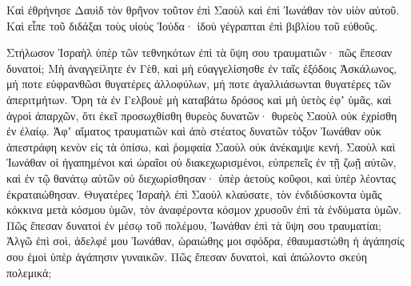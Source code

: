 {\par }{\PP {}Καὶ ἐθρήνησε Δαυὶδ τὸν θρῆνον τοῦτον ἐπὶ Σαοὺλ καὶ ἐπὶ Ἰωνάθαν τὸν υἱὸν αὐτοῦ.
Καὶ εἶπε τοῦ διδάξαι τοὺς υἱοὺς Ἰούδα· ἰδοὺ γέγραπται ἐπὶ βιβλίου τοῦ εὐθοῦς.
\par }{\PP {}Στήλωσον Ἰσραὴλ ὑπὲρ τῶν τεθνηκότων ἐπὶ τὰ ὕψη σου τραυματιῶν· πῶς ἔπεσαν δυνατοί;
Μὴ ἀναγγείλητε ἐν Γὲθ, καὶ μὴ εὐαγγελίσησθε ἐν ταῖς ἐξόδοις Ἀσκάλωνος, μή ποτε εὐφρανθῶσι θυγατέρες ἀλλοφύλων, μή ποτε ἀγαλλιάσωνται θυγατέρες τῶν ἀπεριτμήτων.
Ὄρη τὰ ἐν Γελβουὲ μὴ καταβάτω δρόσος καὶ μὴ ὑετὸς ἐφʼ ὑμᾶς, καὶ ἀγροὶ ἀπαρχῶν, ὅτι ἐκεῖ προσωχθίσθη θυρεὸς δυνατῶν· θυρεὸς Σαοὺλ οὐκ ἐχρίσθη ἐν ἐλαίῳ.
Ἀφʼ αἵματος τραυματιῶν καὶ ἀπὸ στέατος δυνατῶν τόξον Ἰωνάθαν οὐκ ἀπεστράφη κενὸν εἰς τὰ ὀπίσω, καὶ ῥομφαία Σαοὺλ οὐκ ἀνέκαμψε κενή.
Σαοὺλ καὶ Ἰωνάθαν οἱ ἠγαπημένοι καὶ ὡραῖοι οὐ διακεχωρισμένοι, εὐπρεπεῖς ἐν τῇ ζωῇ αὐτῶν, καὶ ἐν τῷ θανάτῳ αὐτῶν οὐ διεχωρίσθησαν· ὑπὲρ ἀετοὺς κοῦφοι, καὶ ὑπὲρ λέοντας ἐκραταιώθησαν.
Θυγατέρες Ἰσραὴλ ἐπὶ Σαοὺλ κλαύσατε, τὸν ἐνδιδύσκοντα ὑμᾶς κόκκινα μετὰ κόσμου ὑμῶν, τὸν ἀναφέροντα κόσμον χρυσοῦν ἐπὶ τὰ ἐνδύματα ὑμῶν.
Πῶς ἔπεσαν δυνατοὶ ἐν μέσῳ τοῦ πολέμου, Ἰωνάθαν ἐπὶ τὰ ὕψη σου τραυματίαι;
Ἀλγῶ ἐπὶ σοὶ, ἀδελφέ μου Ἰωνάθαν, ὡραιώθης μοι σφόδρα, ἐθαυμαστώθη ἡ ἀγάπησίς σου ἐμοὶ ὑπὲρ ἀγάπησιν γυναικῶν.
Πῶς ἔπεσαν δυνατοὶ, καὶ ἀπώλοντο σκεύη πολεμικά;

}
